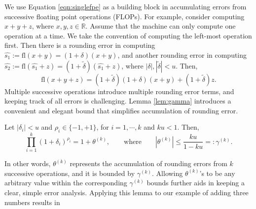 \documentclass[review,onefignum,onetabnum]{siamart190516}
\newcommand{\R}{\mathbb{R}}
\newcommand{\dd}{\delta}
\newcommand{\tth}{\theta}
\newcommand{\fl}{\mathrm{fl}}
\begin{document}
We use Equation \ref{eqn:singlefpe} as a building block in accumulating errors from successive floating point operations (FLOPs).
For example, consider computing $x+y+z$, where $x,y,z\in\R$.
Assume that the machine can only compute one operation at a time.
We take the convention of computing the left-most operation first.
Then there is a rounding error in computing $\hat{s_1}:= \fl(x+y) = (1+\dd)(x+y)$, and another rounding error in computing $\hat{s_2}:= \fl(\hat{s_1}+ z) = (1+\tilde{\dd})(\hat{s_1}+z)$, where $|\dd|,|\tilde{\dd}|<u$.
Then, 
\begin{equation}
\fl(x+y+z) = (1+\tilde{\dd})(1+\dd) (x+y) + (1+\tilde{\dd}) z.\label{eqn:FPbasic3}
\end{equation}
Multiple successive operations introduce multiple rounding error terms, and keeping track of all errors is challenging.
Lemma \ref{lem:gamma} introduces a convenient and elegant bound that simplifies accumulation of rounding error. 
\begin{lemma}
	\label{lem:gamma}
	Let $|\dd_i|<u$ and $\rho_i \in\{-1, +1\}$, for $i = 1 , \cdots, k$ and $ku < 1$. Then, 
	\begin{equation}
	\prod_{i=1}^k (1+\dd_i)^{\rho_i} = 1 + \tth^{(k)},
	\qquad \mbox{where} \qquad
	|\tth^{(k)}|\leq \frac{ku}{1-ku}=:\gamma^{(k)}.
	\end{equation}
\end{lemma}
In other words, $\tth^{(k)}$ represents the accumulation of rounding errors from $k$ successive operations, and it is bounded by $\gamma^{(k)}$. 
Allowing $\tth^{(k)}$'s to be any arbitrary value within the corresponding $\gamma^{(k)}$ bounds further aids in keeping a clear, simple error analysis. 
Applying this lemma to our example of adding three numbers results in
\end{document}
